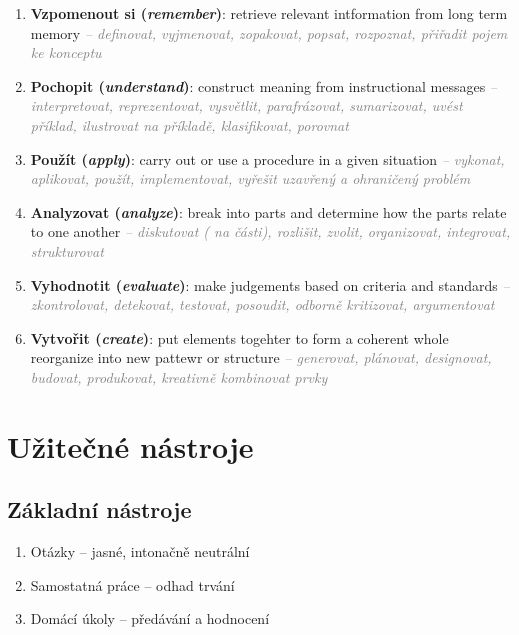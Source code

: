 \documentclass[twoside,openany,10pt]{book}
\newcommand{\note}[1]{\textcolor{gray}{\small\itshape #1}}
\begin{document}
\begin{enumerate}[leftmargin=*]
\item \textbf{Vzpomenout si (\textit{remember})}: retrieve relevant intformation from long term memory
\note{-- definovat, vyjmenovat, zopakovat, popsat, rozpoznat, přiřadit pojem ke konceptu}

\item \textbf{Pochopit (\textit{understand})}: construct meaning from instructional messages
\note{-- interpretovat, reprezentovat, vysvětlit, parafrázovat, sumarizovat, uvést příklad, ilustrovat na příkladě, klasifikovat, porovnat}

\item \textbf{Použít (\textit{apply})}: carry out or use a procedure in a given situation
\note{-- vykonat, aplikovat, použít, implementovat, vyřešit uzavřený a ohraničený problém}

\item \textbf{Analyzovat (\textit{analyze})}: break into parts and determine how the parts relate to one another
\note{-- diskutovat ( na části), rozlišit, zvolit, organizovat, integrovat, strukturovat}

\item \textbf{Vyhodnotit (\textit{evaluate})}: make judgements based on criteria and standards
\note{-- zkontrolovat, detekovat, testovat, posoudit, odborně kritizovat, argumentovat}

\item \textbf{Vytvořit (\textit{create})}: put elements togehter to form a coherent whole reorganize into new pattewr or structure
\note{-- generovat, plánovat, designovat, budovat, produkovat, kreativně kombinovat prvky}
\end{enumerate}

\chapter*{Užitečné nástroje}

\section*{Základní nástroje}
\begin{enumerate}
\item Otázky -- jasné, intonačně neutrální
\item Samostatná práce -- odhad trvání
\item Domácí úkoly -- předávání a hodnocení
\end{enumerate}
\end{document}
